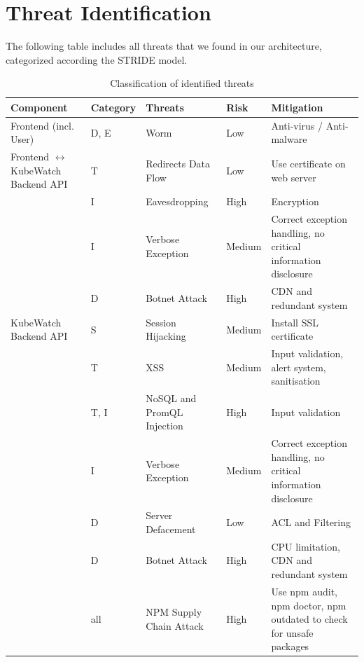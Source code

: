 \newpage
\section{Threat Identification}
The following table includes all threats that we found in our architecture, categorized according the STRIDE model.
\begin{longtable}[h!]{p{2.1cm} | p{1.8cm} | p{3cm} | p{2cm} | p{3.5cm}}
    \textbf{Component} & \textbf{Category} & \textbf{Threats} & \textbf{Risk} & \textbf{Mitigation} \\ \hline
    \endhead
    \caption{\label{tab:threats-classification}Classification of identified threats}
    \endlastfoot
    Frontend (incl. User)              
                        & D, E & Worm & Low & Anti-virus / Anti-malware\\
    \hline
    Frontend  \(\leftrightarrow\) KubeWatch Backend API
                        & T & Redirects Data Flow & Low & Use certificate on web server \\
                        & I & Eavesdropping & High & Encryption \\
                        & I & Verbose Exception & Medium & Correct exception handling, no critical information disclosure \\
                        & D & Botnet Attack & High & CDN and redundant system \\
    \hline
    KubeWatch Backend API
                        & S & Session Hijacking & Medium & Install SSL certificate \\
                        & T & XSS & Medium & Input validation, alert system, sanitisation \\
                        & T, I & NoSQL and PromQL Injection & High & Input validation \\
                        & I & Verbose Exception & Medium & Correct exception handling, no critical information disclosure \\
                        & D & Server Defacement & Low & ACL and Filtering \\
                        & D & Botnet Attack & High & CPU limitation, CDN and redundant system \\
                        &all& NPM Supply Chain Attack & High & Use npm audit, npm doctor, npm outdated to check for unsafe packages \\

\end{longtable}
